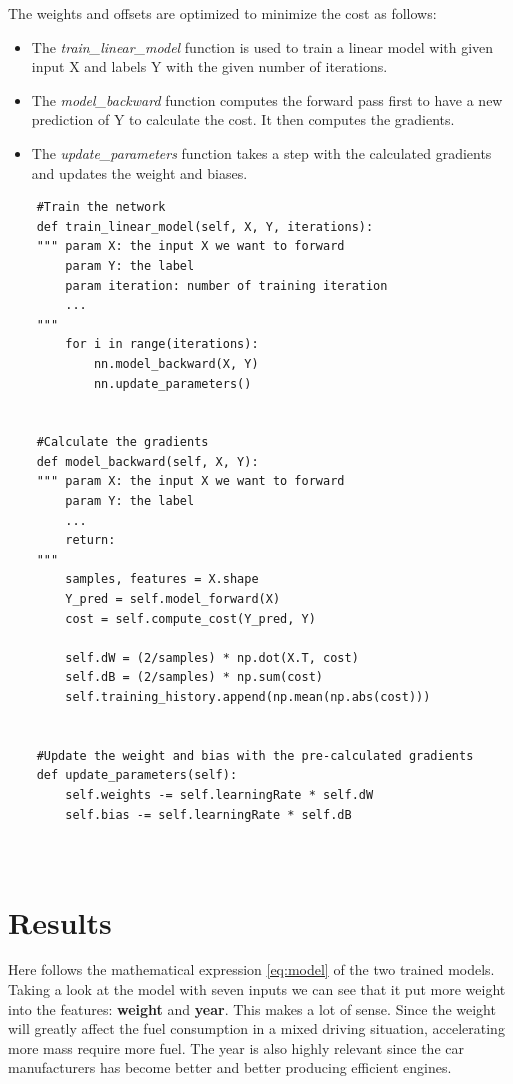 \documentclass[a4paper,10pt]{article}
\begin{document}
\newpage
\hfill \break
The weights and offsets are optimized to minimize the cost as follows:
\begin{itemize}
\item
The \emph{train\_linear\_model} function is used to train a linear model with given input X and labels Y with the given number of iterations. 
\item
The \emph{model\_backward} function computes the forward pass first to have a new prediction of Y to calculate the cost. It then computes the gradients.
\item The \emph{update\_parameters} function takes a step with the calculated gradients and updates the weight and biases. 
\end{itemize}


\begin{lstlisting}
    #Train the network
    def train_linear_model(self, X, Y, iterations):
    """ param X: the input X we want to forward
        param Y: the label
        param iteration: number of training iteration
        ...
    """
        for i in range(iterations):
            nn.model_backward(X, Y)
            nn.update_parameters()


    #Calculate the gradients 
    def model_backward(self, X, Y):
    """ param X: the input X we want to forward
        param Y: the label
        ...
        return: 
    """ 
        samples, features = X.shape
        Y_pred = self.model_forward(X)
        cost = self.compute_cost(Y_pred, Y)
        
        self.dW = (2/samples) * np.dot(X.T, cost) 
        self.dB = (2/samples) * np.sum(cost)
        self.training_history.append(np.mean(np.abs(cost)))


    #Update the weight and bias with the pre-calculated gradients
    def update_parameters(self):
        self.weights -= self.learningRate * self.dW
        self.bias -= self.learningRate * self.dB



\end{lstlisting}


\section{Results}

Here follows the mathematical expression \eqref{eq:model} of the two trained models. Taking a look at the model with seven inputs we can see that it put more weight into the features: \textbf{weight} and \textbf{year}. This makes a lot of sense. Since the weight will greatly affect the fuel consumption in a mixed driving situation, accelerating more mass require more fuel. The year is also highly relevant since the car manufacturers has become better and better producing efficient engines. 
\end{document}
